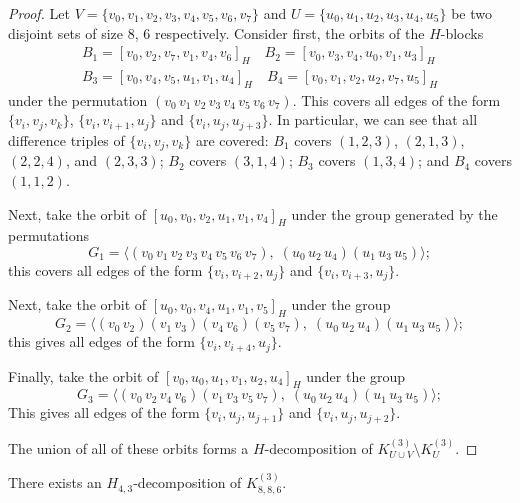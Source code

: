\begin{subappendices}
\begin{proof}
Let $V = \{v_0, v_1, v_2, v_3, v_4, v_5, v_6, v_7\}$ and $U = \{u_0, u_1, u_2,
u_3, u_4, u_5\}$ be two disjoint sets of size 8, 6 respectively. Consider first, the orbits of the $H$-blocks
\begin{align*}
    B_1 = [v_0, v_2, v_7, v_1, v_4, v_6]_H \quad
    B_2 = [v_0, v_3, v_4, u_0, v_1, u_3]_H \\
    B_3 = [v_0, v_4, v_5, u_1, v_1, u_4]_H \quad
    B_4 = [v_0, v_1, v_2, u_2, v_7, u_5]_H
\end{align*}
under the permutation $(v_0 \, v_1 \, v_2 \, v_3 \, v_4 \, v_5 \, v_6 \,
v_7)$. This covers all edges of the form $\{v_i, v_j, v_k\}$, $\{v_i,
v_{i+1}, u_j\}$ and $\{v_i, u_j, u_{j+3}\}$. In particular, we can see that all difference triples of $\{v_i, v_j, v_k\}$ are covered: $B_1$ covers $(1, 2, 3)$, $(2, 1, 3)$, $(2, 2, 4)$, and $(2, 3, 3)$; $B_2$ covers $(3, 1, 4)$; $B_3$ covers $(1, 3, 4)$; and $B_4$ covers $(1, 1, 2)$.

Next, take the orbit of $[u_0, v_0, v_2, u_1, v_1, v_4]_H$ under the group generated by the permutations
\[
    G_1 = \langle (v_0 \, v_1 \, v_2 \, v_3 \, v_4 \, v_5 \, v_6 \, v_7),
    \; (u_0 \, u_2 \, u_4) (u_1 \, u_3 \, u_5) \rangle;
\]
this covers all edges of the form $\{v_i, v_{i+2}, u_j\}$ and $\{v_i, v_{i+3}, u_j\}$.

Next, take the orbit of $[u_0, v_0, v_4, u_1, v_1, v_5]_H$ under the group
\[
    G_2 = \langle (v_0 \, v_2) (v_1 \, v_3) (v_4 \, v_6) (v_5 \, v_7), \;
    (u_0 \, u_2 \, u_4) (u_1 \, u_3 \, u_5) \rangle;
\]
this gives all edges of the form $\{v_i, v_{i+4}, u_j\}$.

Finally, take the orbit of $[v_0, u_0, u_1, v_1, u_2, u_4]_H$ under the group
\[
    G_3 = \langle (v_0 \, v_2 \, v_4 \, v_6) (v_1 \, v_3 \, v_5 \, v_7), \;
    (u_0 \, u_2 \, u_4) (u_1 \, u_3 \, u_5) \rangle;
\]
This gives all edges of the form $\{v_i, u_j, u_{j+1}\}$ and $\{v_i, u_j, u_{j+2}\}$.

The union of all of these orbits forms a $H$-decomposition of $K_{U \cup
V}^{(3)} \setminus K_{U}^{(3)}$.
\end{proof}



\begin{example} \label{eg:H_43-k886}
There exists an $H_{4,3}$-decomposition of $K_{8,8,6}^{(3)}$.
\end{example}


\end{subappendices}
